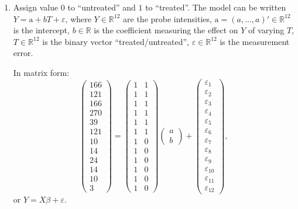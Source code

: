 \documentclass[a4paper,11pt]{article}
\renewcommand{\epsilon}{\varepsilon}
\begin{document}
\begin{enumerate}
\item Assign value $0$ to ``untreated'' and $1$ to ``treated''.
The model can be written $Y = \text{a} + bT + \epsilon$, where
$Y \in \mathbb{R}^{12}$ are the probe intensities, 
$\text{a} = (a,...,a)' \in \mathbb{R}^{12}$ is the intercept, 
$b \in \mathbb{R}$ is the coefficient measuring the effect on $Y$ of varying $T$, 
$T \in \mathbb{R}^{12}$ is the binary vector ``treated/untreated'', 
$\epsilon \in \mathbb{R}^{12}$ is the measurement error.

\noindent
In matrix form:
$$
\left(
\begin{array}{c}
166\\121\\166\\270\\39\\121\\10\\14\\24\\14\\10\\3
\end{array}
\right)
=
\left(
\begin{array}{cc}
1 & 1 \\ 1 & 1 \\ 1 & 1 \\ 1 & 1 \\ 1& 1 \\ 1 & 1 \\ 1 & 0 \\ 1 & 0 \\ 1 & 0 \\ 1 & 0 \\ 1 & 0 \\ 1 & 0
\end{array}
\right)
\left(
\begin{array}{c}
a \\ b
\end{array}
\right)
+
\left(
\begin{array}{c}
\epsilon_1 \\ \epsilon_2 \\ \epsilon_3 \\ \epsilon_4 \\ \epsilon_5 \\ \epsilon_6 \\ \epsilon_7 \\ \epsilon_8 \\ \epsilon_9 \\ 
\epsilon_{10} \\ \epsilon_{11} \\ \epsilon_{12} 
\end{array}
\right) ,
$$
or $Y = X \beta + \epsilon$.


\end{enumerate}
\end{document}
